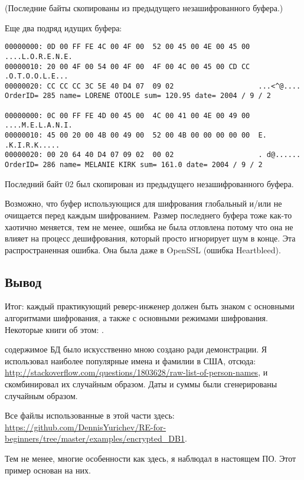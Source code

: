 (Последние байты  скопированы из предыдущего незашифрованного буфера.)

Еще два подряд идущих буфера:

\begin{lstlisting}
00000000: 0D 00 FF FE 4C 00 4F 00  52 00 45 00 4E 00 45 00  ....L.O.R.E.N.E.
00000010: 20 00 4F 00 54 00 4F 00  4F 00 4C 00 45 00 CD CC   .O.T.O.O.L.E...
00000020: CC CC CC 3C 5E 40 D4 07  09 02                    ...<^@....
OrderID= 285 name= LORENE OTOOLE sum= 120.95 date= 2004 / 9 / 2

00000000: 0C 00 FF FE 4D 00 45 00  4C 00 41 00 4E 00 49 00  ....M.E.L.A.N.I.
00000010: 45 00 20 00 4B 00 49 00  52 00 4B 00 00 00 00 00  E. .K.I.R.K.....
00000020: 00 20 64 40 D4 07 09 02  00 02                    . d@......
OrderID= 286 name= MELANIE KIRK sum= 161.0 date= 2004 / 9 / 2
\end{lstlisting}

Последний байт 02 был скопирован из предыдущего незашифрованного буфера.

Возможно, что буфер использующися для шифрования глобальный и/или не очищается перед каждым шифрованием.
Размер последнего буфера тоже как-то хаотично меняется, тем не менее, ошибка не была отловлена потому что она не влияет
на процесс дешифрования, который просто игнорирует шум в конце.
Эта распространенная ошибка.
Она была даже в OpenSSL (ошибка Heartbleed).

\subsection{Вывод}

Итог:
каждый практикующий реверс-инженер должен быть знаком с основными алгоритмами шифрования, а также с основными режимами
шифрования.
Некоторые книги об этом: .

 содержимое БД было искусственно мною создано ради демонстрации.
Я использовал наиболее популярные имена и фамилии в США, отсюда: \url{http://stackoverflow.com/questions/1803628/raw-list-of-person-names},
и скомбинировал их случайным образом.
Даты и суммы были сгенерированы случайным образом.

Все файлы использованные в этой части здесь:
\url{https://github.com/DennisYurichev/RE-for-beginners/tree/master/examples/encrypted_DB1}.

Тем не менее, многие особенности как здесь, я наблюдал в настоящем ПО.
Этот пример основан на них.

